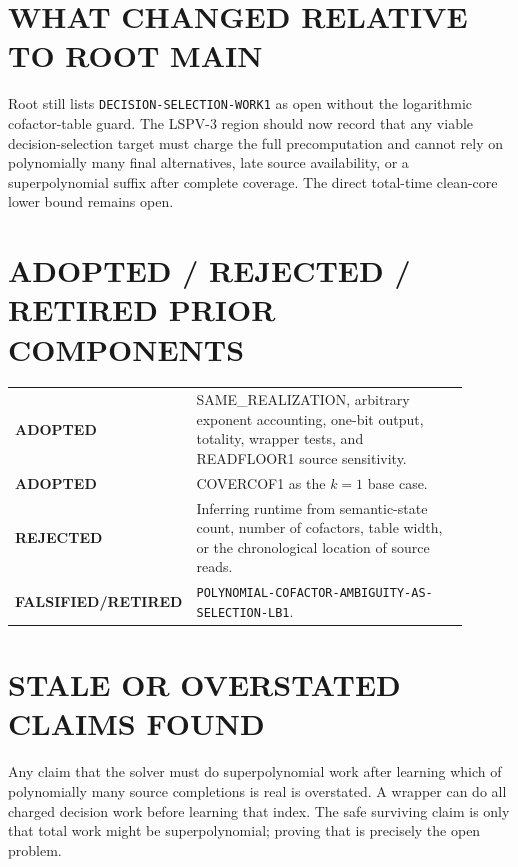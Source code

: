 \documentclass[11pt]{article}
\newcommand{\Status}[1]{\textbf{#1}}
\begin{document}
\section{WHAT CHANGED RELATIVE TO ROOT MAIN}
Root  still lists \texttt{DECISION-SELECTION-WORK1} as open
without the logarithmic cofactor-table guard. The LSPV-3 region should now
record that any viable decision-selection target must charge the full
precomputation and cannot rely on polynomially many final alternatives,
late source availability, or a superpolynomial suffix after complete coverage.
The direct total-time clean-core lower bound remains open.

\section{ADOPTED / REJECTED / RETIRED PRIOR COMPONENTS}
\begin{center}
\begin{tabular}{>{\raggedright}p{0.22\linewidth}p{0.68\linewidth}}
\toprule
\Status{ADOPTED} & SAME\_REALIZATION, arbitrary exponent accounting, one-bit
output, totality, wrapper tests, and READFLOOR1 source sensitivity.\\
\Status{ADOPTED} & COVERCOF1 as the \(k=1\) base case.\\
\Status{REJECTED} & Inferring runtime from semantic-state count, number of
cofactors, table width, or the chronological location of source reads.\\
\Status{FALSIFIED/RETIRED} &
\texttt{POLYNOMIAL-COFACTOR-AMBIGUITY-AS-SELECTION-LB1}.\\
\bottomrule
\end{tabular}
\end{center}

\section{STALE OR OVERSTATED CLAIMS FOUND}
Any claim that the solver must do superpolynomial work after learning which of
polynomially many source completions is real is overstated. A wrapper can do
all charged decision work before learning that index. The safe surviving claim
is only that total work might be superpolynomial; proving that is precisely the
open problem.
\end{document}
